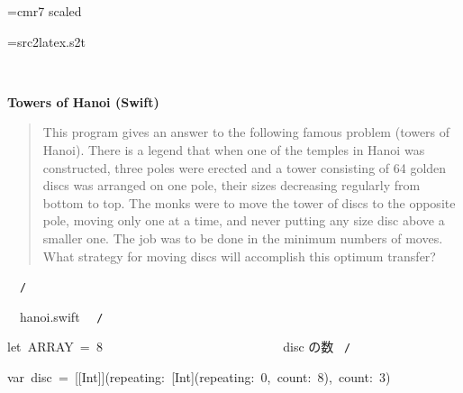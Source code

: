 \documentclass{article}
\begin{document}
\ifx\sevenrm\undefined
  \font\sevenrm=cmr7 scaled 
\fi

\newread\MyStyle
\openin\MyStyle=src2latex.s2t
\ifeof\MyStyle
  \closein\MyStyle
\else
  
  \closein\MyStyle
\fi

\def\mc{\relax}
\def\gt{\relax}
\def\sc{\scshape}

\tt\mc 

\noindent
\rm\mc {\tt /}{\tt *}\  \hrulefill \rm\mc \ {\tt *}

\noindent
\mbox{}\hfill

\noindent
\mbox{}\hfill

\noindent
\mbox{} {}%

\centerline{\bf Towers of Hanoi (Swift)}

\begin{quote}

This program gives an answer to the following famous problem (towers of
Hanoi).
There is a legend that when one of the temples in Hanoi was constructed,
three poles were erected and a tower consisting of 64 golden discs was
arranged on one pole, their sizes decreasing regularly from bottom to top.
The monks were to move the tower of discs to the opposite pole, moving
only one at a time, and never putting any size disc above a smaller one.
The job was to be done in the minimum numbers of moves. What strategy for
moving discs will accomplish this optimum transfer?
\end{quote}


\noindent
\mbox{}\hfill

\noindent
\mbox{}{\tt *}\  \hrulefill \rm\mc \ {\tt *}{\tt /}
\tt\mc 

\noindent
\mbox{}\hfill

\noindent
\mbox{}\hfill

\noindent
\mbox{}\rm\mc {\tt /}{\tt *}\  \hrulefill\ hanoi.swift \ \hrulefill \rm\mc \ {\tt *}{\tt /}
\tt\mc 

\noindent
\mbox{}\hfill

\noindent
\mbox{}\hfill

\noindent
\mbox{}let{\tt\mc \ }ARRAY{\tt\mc \ }={\tt\mc \ }8{\tt\mc \ \ \ }{\tt\mc \ \ \ \ \ \ \ \ }{\tt\mc \ \ \ \ \ \ \ \ }{\tt\mc \ \ \ \ \ \ \ \ }\rm\mc {\tt /}{\tt *}\  {}disc の数 \hfill \rm\mc \ {\tt *}{\tt /}
\tt\mc 

\noindent
\mbox{}\hfill

\noindent
\mbox{}var{\tt\mc \ }disc{\tt\mc \ }={\tt\mc \ }[[Int]](repeating:{\tt\mc \ }[Int](repeating:{\tt\mc \ }0,{\tt\mc \ }count:{\tt\mc \ }8),{\tt\mc \ }count:{\tt\mc \ }3)
\end{document}

